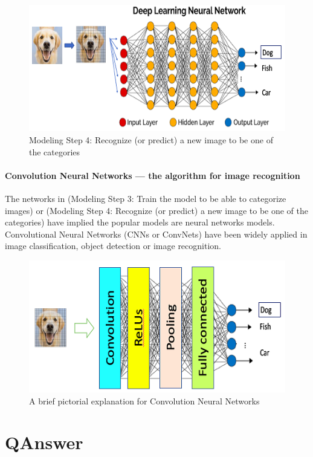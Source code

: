 \documentclass[12pt]{article}
\begin{document}
\begin{figure}[!h]
\center
\includegraphics{1_oQlLQi3Psy4Qm05xuWtxZQ.png}
\caption{Modeling Step 4: Recognize (or predict) a new image to be one of the categories}
\end{figure}
\paragraph{Convolution Neural Networks — the algorithm for image recognition}The networks in (Modeling Step 3: Train the model to be able to categorize images) or (Modeling Step 4: Recognize (or predict) a new image to be one of the categories) have implied the popular models are neural networks models. Convolutional Neural Networks (CNNs or ConvNets) have been widely applied in image classification, object detection or image recognition\cite{imageRecognitionDetails}.
\newpage


\begin{figure}[!h]
\center
\includegraphics{1_XHQWcvcKWwyp8bcBg_butQ.png}
\caption{A brief pictorial explanation for Convolution Neural Networks}
\end{figure}


\section{QAnswer}
\end{document}
